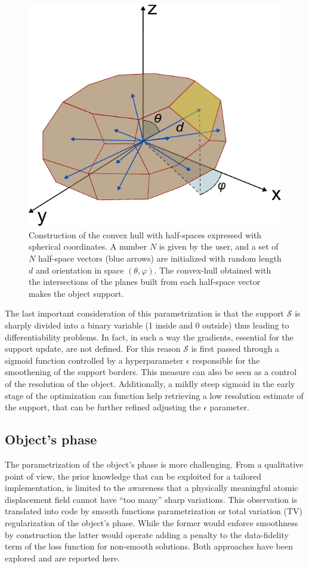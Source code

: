 \begin{figure}[H]
    \centering
    \includegraphics[width=.8\textwidth]{figures/AD/AD.pdf}
    \caption{Construction of the convex hull with half-spaces expressed with spherical coordinates. A number $N$ 
     is given by the user, and a set of $N$ half-space vectors (blue arrows) are initialized with random length $d$ and 
     orientation in space $(\theta, \varphi)$. The convex-hull obtained with the intersections of the planes built from 
     each half-space vector makes the object support.}
    \label{fig:support_construction}
\end{figure}

The last important consideration of this parametrization is that the support $\mathcal S$ is sharply divided into a binary 
variable (1 inside and 0 outside) thus leading to differentiability problems. In fact, in such a way the gradients, essential for the 
support update, are not defined. For this reason $\mathcal S$ is first passed through a sigmoid function controlled by a
hyperparameter $\epsilon$ responsible for the smoothening of the support borders. This measure can also be seen as a control of the 
resolution of the object. Additionally, a mildly steep sigmoid in the early stage of the optimization can function help retrieving 
a low resolution estimate of the support, that can be further refined adjusting the $\epsilon$ parameter. \\

\subsection{Object's phase}
The parametrization of the object's phase is more challenging. From a qualitative point of view, the prior knowledge 
that can be exploited for a tailored implementation, is limited to the awareness that a physically meaningful atomic displacement 
field cannot have ``too many'' sharp variations. This observation is translated into code by smooth functions parametrization or total 
variation (TV) regularization \cite{totalVariation1992} of the object's phase. While the former would enforce smoothness by construction the latter 
would operate adding a penalty to the data-fidelity term of the loss function for non-smooth solutions. Both approaches have been 
explored and are reported here. \\

